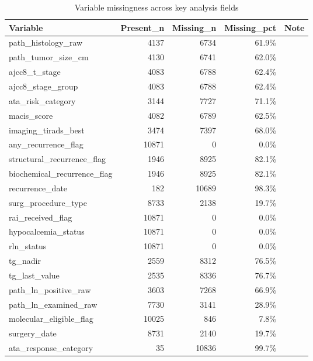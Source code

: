 \begin{table}[htbp]
\centering
\caption{Variable missingness across key analysis fields}
\label{tab:missingness}
\begin{tabular}{lrrrr}
\toprule
Variable & Present\_n & Missing\_n & Missing\_pct & Note \\
\midrule
path\_histology\_raw & 4137 & 6734 & 61.9\% &  \\
path\_tumor\_size\_cm & 4130 & 6741 & 62.0\% &  \\
ajcc8\_t\_stage & 4083 & 6788 & 62.4\% &  \\
ajcc8\_stage\_group & 4083 & 6788 & 62.4\% &  \\
ata\_risk\_category & 3144 & 7727 & 71.1\% &  \\
macis\_score & 4082 & 6789 & 62.5\% &  \\
imaging\_tirads\_best & 3474 & 7397 & 68.0\% &  \\
any\_recurrence\_flag & 10871 & 0 & 0.0\% &  \\
structural\_recurrence\_flag & 1946 & 8925 & 82.1\% &  \\
biochemical\_recurrence\_flag & 1946 & 8925 & 82.1\% &  \\
recurrence\_date & 182 & 10689 & 98.3\% &  \\
surg\_procedure\_type & 8733 & 2138 & 19.7\% &  \\
rai\_received\_flag & 10871 & 0 & 0.0\% &  \\
hypocalcemia\_status & 10871 & 0 & 0.0\% &  \\
rln\_status & 10871 & 0 & 0.0\% &  \\
tg\_nadir & 2559 & 8312 & 76.5\% &  \\
tg\_last\_value & 2535 & 8336 & 76.7\% &  \\
path\_ln\_positive\_raw & 3603 & 7268 & 66.9\% &  \\
path\_ln\_examined\_raw & 7730 & 3141 & 28.9\% &  \\
molecular\_eligible\_flag & 10025 & 846 & 7.8\% &  \\
surgery\_date & 8731 & 2140 & 19.7\% &  \\
ata\_response\_category & 35 & 10836 & 99.7\% &  \\
\bottomrule
\end{tabular}
\end{table}

